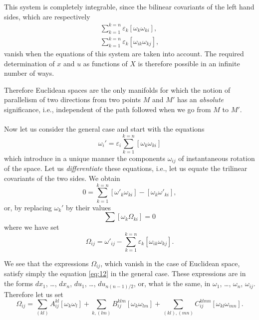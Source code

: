 \documentclass[leqno,12pt]{article}
\makeatletter
\let\old@epsilon\epsilon
\let\old@varepsilon\varepsilon
\let\epsilon\old@varepsilon
\let\varepsilon\old@epsilon
\theoremstyle{shape1}
\theoremstyle{shape0}
\theoremstyle{shape2}
\theoremstyle{definition}
\makeatother
\begin{document}
This system is completely integrable, since the bilinear covariants of the left hand sides, which are respectively
\begin{gather*}
  \sum_{k=1}^{k=n}\epsilon_{k}[\omega_{k}\omega_{ki}],\\
  \sum_{k=1}^{k=n}\epsilon_{k}[\omega_{ik}\omega_{kj}],
\end{gather*}
vanish when the equations of this system are taken into account. The required determination of $x$ and $u$ as functions of $X$ is therefore possible in an infinite number of ways.

Therefore Euclidean spaces are the only manifolds for which the notion of parallelism of two directions from two points $M$ and $M'$ has an \emph{absolute} significance, i.e., independent of the path followed when we go from $M$ to $M'$.

\paragraph{}
\label{sec:7}
Now let us consider the general case and start with the equations
\begin{equation}
  \label{eq:10'}\tag{10}
  \omega_{i}'=\epsilon_{i}\sum_{k=1}^{k=n}[\omega_{k}\omega_{ki}]
\end{equation}
which introduce in a unique manner the components $\omega_{ij}$ of instantaneous rotation of the space. Let us \emph{differentiate} these equations, i.e., let us equate the trilinear covariants of the two sides. We obtain
\[
0=\sum_{k=1}^{k=n}[\omega'_{k}\omega_{ki}]-[\omega_{k}\omega'_{ki}],
\]
or, by replacing $\omega_{k}'$ by their values
\begin{equation}
  \label{eq:12}
  \sum[\omega_{k}\Omega_{ki}]=0
\end{equation}
where we have set
\begin{equation}
  \label{eq:13}
  \Omega_{ij}=\omega'_{ij}-\sum_{k=1}^{k=n}\epsilon_{k}[\omega_{ik}\omega_{kj}].
\end{equation}

We see that the expressions $\Omega_{ij}$, which vanish in the case of Euclidean space, satisfy simply the equation \eqref{eq:12} in the general case. These expressions are in the forms $dx_{1}$, \dots , $dx_{n}$, $du_{1}$, \dots , $du_{n(n-1)/2}$, or, what is the same, in $\omega_{1}$, \dots , $\omega_{n}$, $\omega_{ij}$. Therefore let us set
\[
\Omega_{ij}=\sum_{(kl)}A^{kl}_{ij}[\omega_{k}\omega_{l}]+\sum_{k,(lm)}B^{klm}_{ij}[\omega_{k}\omega_{lm}]+\sum_{(kl),(mn)}C^{klmn}_{ij}[\omega_{kl}\omega_{mn}].
\]
\end{document}

